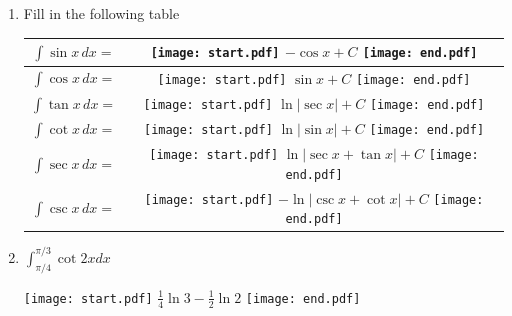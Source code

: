 \documentclass[12pt]{article}
\begin{document}
\begin{enumerate}

\item Fill in the following table

\begin{center}
\begin{tabular}{c|c}
$\int{\sin{x}}\,dx=$&\hspace{1 cm}\texttt{[image: start.pdf]}
{{$-\cos{x}+C$}}
\texttt{[image: end.pdf]}
 \hspace{1 cm}\\
\hline
$\int{\cos{x}}\,dx=$&\hspace{1 cm}\texttt{[image: start.pdf]}
{{$\sin{x}+C$}}
\texttt{[image: end.pdf]}
 \hspace{1 cm}\\
\hline
$\int{\tan{x}}\,dx=$&\hspace{1 cm}\texttt{[image: start.pdf]}
{{$\ln{|\sec{x}|}+C$}}
\texttt{[image: end.pdf]}
 \hspace{1 cm}\\
\hline
$\int{\cot{x}}\,dx=$&\hspace{1 cm}\texttt{[image: start.pdf]}
{{$\ln{|\sin{x}|}+C$}}
\texttt{[image: end.pdf]}
 \hspace{1 cm}\\
\hline
$\int{\sec{x}}\,dx=$&\hspace{1 cm}\texttt{[image: start.pdf]}
{{$\ln{|\sec{x}+\tan{x}|}+C$}}
\texttt{[image: end.pdf]}
 \hspace{1 cm}\\
\hline
$\int{\csc{x}}\,dx=$&\hspace{1 cm}\texttt{[image: start.pdf]}
{{$-\ln{|\csc{x}+\cot{x}|}+C$}}
\texttt{[image: end.pdf]}
 \hspace{1 cm}\\
\end{tabular}
\end{center}

\item $\int_{\pi/4}^{\pi/3} \cot{2x}dx$ 

\texttt{[image: start.pdf]}
{{$\frac{1}{4}\ln{3}-\frac{1}{2}\ln{2}$}}
\texttt{[image: end.pdf]}


\end{enumerate}

\end{document}
